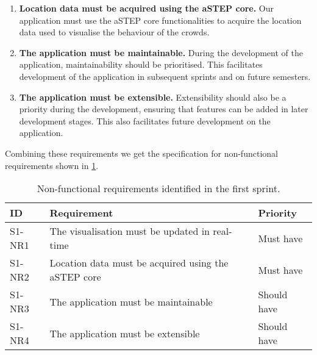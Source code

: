 \begin{enumerate}[resume]
    \item \textbf{Location data must be acquired using the aSTEP core.} Our application must use the aSTEP core functionalities to acquire the location data used to visualise the behaviour of the crowds.
    \item \textbf{The application must be maintainable.} During the development of the application, maintainability should be prioritised. This facilitates development of the application in subsequent sprints and on future semesters.
    \item \textbf{The application must be extensible.} Extensibility should also be a priority during the development, ensuring that features can be added in later development stages. This also facilitates future development on the application.
\end{enumerate}

Combining these requirements we get the specification for non-functional requirements shown in \cref{tab:s1_nreqs}.

\begin{table}[h!]
	\centering
	\begin{tabularx}{\textwidth}{lXl}
		\toprule
		\textbf{ID} & \textbf{Requirement} & \textbf{Priority} \\
		\midrule 
		\rowcolor[HTML]{EFEFEF} 
		S1-NR1 & The visualisation must be updated in real-time & Must have \\
		S1-NR2 & Location data must be acquired using the aSTEP core & Must have \\
		\rowcolor[HTML]{EFEFEF} 
		S1-NR3 & The application must be maintainable & Should have \\
		S1-NR4 & The application must be extensible & Should have \\
		\bottomrule
	\end{tabularx}
	\caption{Non-functional requirements identified in the first sprint.}
	\label{tab:s1_nreqs}
\end{table}

